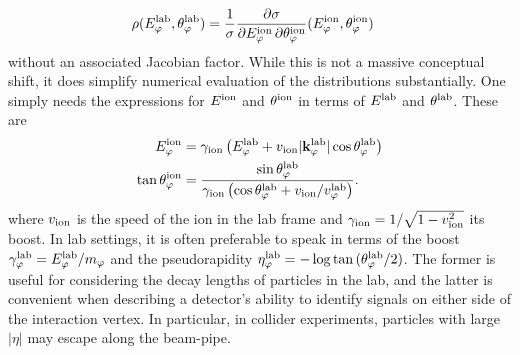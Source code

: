 \begin{align}
    \rho(E_\varphi^{\rm lab}, \theta_\varphi^{\rm lab}) &= \frac{1}{\sigma}\frac{\partial \sigma}{\partial E_\varphi^{\rm ion} \,\partial\theta_\varphi^{\rm ion}}(E_\varphi^{\rm ion}, \theta_\varphi^{\rm ion})
\end{align}
without an associated Jacobian factor. While this is not a massive conceptual shift, it does simplify numerical evaluation of the distributions substantially. One simply needs the expressions for $E^{\rm ion}$ and $\theta^{\rm ion}$ in terms of $E^{\rm lab}$ and $\theta^{\rm lab}$. These are
\begin{align}
    E_\varphi^{\rm ion} &= \gamma_{\rm ion}\left(E_\varphi^{\rm lab} + v_{\rm ion} |{\bf k}^{\rm lab}_\varphi|\cos{\theta_\varphi^{\rm lab}}\right)\label{eq:E_transform}\\
    \tan{\theta_\varphi^{\rm ion}} &= \frac{\sin{\theta_\varphi^{\rm lab}}}{\gamma_{\rm ion}\left(\cos{\theta_\varphi^{\rm lab}} + v_{\rm ion}/v_\varphi^{\rm lab}\right)}\label{eq:theta_transform}.
\end{align}
where $v_{\rm ion}$ is the speed of the ion in the lab frame and $\gamma_{\rm ion} = 1/\sqrt{1-v_{\rm ion}^2}$ its boost. In lab settings, it is often preferable to speak in terms of the boost $\gamma_\varphi^{\rm lab} = E_\varphi^{\rm lab}/m_\varphi$ and the pseudorapidity $\eta_{\varphi}^{\rm lab} = -\log{\tan{(\theta_\varphi^{\rm lab}/2)}}$. The former is useful for considering the decay lengths of particles in the lab, and the latter is convenient when describing a detector's ability to identify signals on either side of the interaction vertex. In particular, in collider experiments, particles with large $|\eta|$ may escape along the beam-pipe.

